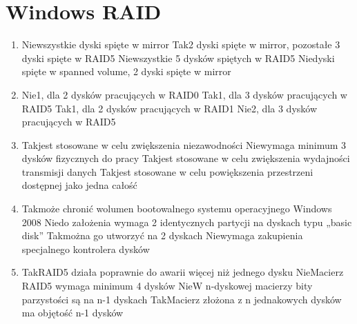 
\newpage
\section{Windows RAID}
	\begin{enumerate}
		\item {}%
		{Nie}{wszystkie dyski spięte w mirror}%
		{Tak}{2 dyski spięte w mirror, pozostałe 3 dyski spięte w RAID5}%
		{Nie}{wszystkie 5 dysków spiętych w RAID5}%
		{Nie}{dyski spięte w spanned volume, 2 dyski spięte w mirror}
		\item {}%
		{Nie}{1, dla 2 dysków pracujących w RAID0}%
		{Tak}{1, dla 3 dysków pracujących w RAID5}%
		{Tak}{1, dla 2 dysków pracujących w RAID1}%
		{Nie}{2, dla 3 dysków pracujących w RAID5}
		\item {}%
		{Tak}{jest stosowane w celu zwiększenia niezawodności}%
		{Nie}{wymaga minimum 3 dysków fizycznych do pracy}%
		{Tak}{jest stosowane w celu zwiększenia wydajności transmisji danych}%
		{Tak}{jest stosowane w celu powiększenia przestrzeni dostępnej jako jedna całość}
		\item {}%
		{Tak}{może chronić wolumen bootowalnego systemu operacyjnego Windows 2008}%
		{Nie}{do założenia wymaga 2 identycznych partycji na dyskach typu „basic disk”}%
		{Tak}{można go utworzyć na 2 dyskach}%
		{Nie}{wymaga zakupienia specjalnego kontrolera dysków}
		\item {}%
		{Tak}{RAID5 działa poprawnie do awarii więcej niż jednego dysku}%
		{Nie}{Macierz RAID5 wymaga minimum 4 dysków}%
		{Nie}{W n-dyskowej macierzy bity parzystości są na n-1 dyskach}%
		{Tak}{Macierz złożona z n jednakowych dysków ma objętość n-1 dysków}

\end{enumerate}
